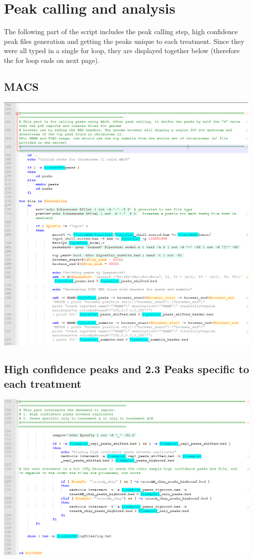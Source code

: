 \documentclass[a4paper,11pt]{article}
\begin{document}
\section{Peak calling and analysis}
\noindent The following part of the script includes the peak calling step, high confidence peak files generation and getting the peaks unique to each treatment. Since they were all typed in a single for loop, they are displayed together below (therefore the for loop ends on next page).
\subsection{MACS}
\noindent \includegraphics[scale=0.75]{MACS1.PNG}
\pagebreak
\subsection{High confidence peaks and 2.3 Peaks specific to each treatment}
\noindent \includegraphics[scale=0.75]{MACS2.PNG} \\
\end{document}
